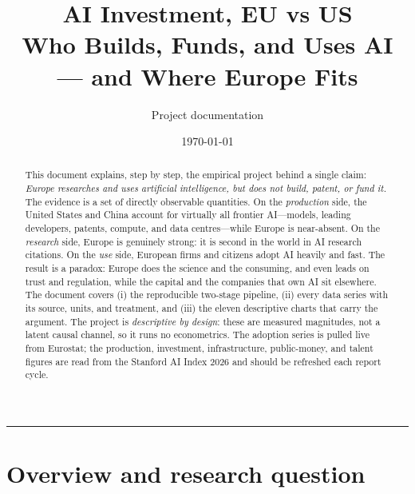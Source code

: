 \documentclass[11pt,a4paper]{article}
\title{\textbf{AI Investment, EU vs US}\\[2pt]
       \large Who Builds, Funds, and Uses AI --- and Where Europe Fits}
\author{Project documentation}
\date{\today}
\begin{document}
\maketitle
\thispagestyle{empty}

\begin{abstract}
\noindent
This document explains, step by step, the empirical project behind a single
claim: \emph{Europe researches and uses artificial intelligence, but does not
build, patent, or fund it.} The evidence is a set of directly observable
quantities. On the \emph{production} side, the United States and China account
for virtually all frontier AI---models, leading developers, patents, compute,
and data centres---while Europe is near-absent. On the \emph{research} side,
Europe is genuinely strong: it is second in the world in AI research citations.
On the \emph{use} side, European firms and citizens adopt AI heavily and fast.
The result is a paradox: Europe does the science and the consuming, and even
leads on trust and regulation, while the capital and the companies that own AI
sit elsewhere. The document covers (i) the reproducible two-stage pipeline,
(ii) every data series with its source, units, and treatment, and (iii) the
eleven descriptive charts that carry the argument. The project is
\emph{descriptive by design}: these are measured magnitudes, not a latent causal
channel, so it runs no econometrics. The adoption series is pulled live from
Eurostat; the production, investment, infrastructure, public-money, and talent
figures are read from the Stanford AI Index 2026 and should be refreshed each
report cycle.
\end{abstract}

\tableofcontents
\bigskip
\hrule
\bigskip

\section{Overview and research question}\label{sec:overview}
\end{document}
